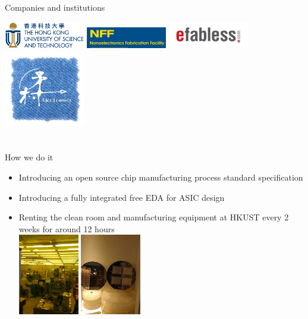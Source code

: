 \documentclass[9pt]{beamer}
\begin{document}
\begin{frame}{Companies and institutions}
	\begin{center}
		\includegraphics[width=100pt]{HKUST_Logo.png}
		\includegraphics[width=100pt]{NFF.jpg}
		\includegraphics[width=100pt]{efabless_logo.png} \\
		\includegraphics[width=100pt]{Lanceville.png}
	\end{center}
\end{frame}

\section[How]{}
\begin{frame}{How we do it}
	\begin{itemize}
		\item Introducing an open source chip manufacturing process standard specification
		\item Introducing a fully integrated free EDA for ASIC design\footnotemark
		\item Renting the clean room and manufacturing equipment at HKUST every 2 weeks for around 12 hours \\		
		\includegraphics[height=100pt]{cleanroom.png}
		\includegraphics[height=100pt]{examples.png}
	\end{itemize}

\end{frame}
\end{document}
